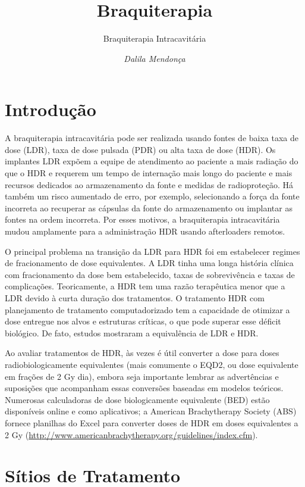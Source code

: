 \documentclass[11pt,a4paper]{article}
\title{\LobsterTwo\Huge{Braquiterapia}}
\author{\LobsterTwo\Large{Braquiterapia Intracavitária}\nocite{*}}
\date{\LobsterTwo\textit{Dalila Mendonça}}
\newcounter{exemplo}
\begin{document}
	\maketitle

\section{Introdução}

	A braquiterapia intracavitária pode ser realizada usando fontes de baixa taxa de dose (LDR), taxa de dose pulsada (PDR) ou alta taxa de dose (HDR). Os implantes LDR expõem a equipe de atendimento ao paciente a mais radiação do que o HDR e requerem um tempo de internação mais longo do paciente e mais recursos dedicados ao armazenamento da fonte e medidas de radioproteção. Há também um risco aumentado de erro, por exemplo, selecionando a força da fonte incorreta ao recuperar as cápsulas da fonte do armazenamento ou implantar as fontes na ordem incorreta. Por esses motivos, a braquiterapia intracavitária mudou amplamente para a administração HDR usando afterloaders remotos.

	O principal problema na transição da LDR para HDR foi em estabelecer regimes de fracionamento de dose equivalentes. A LDR tinha uma longa história clínica com fracionamento da dose bem estabelecido, taxas de sobrevivência e taxas de complicações. Teoricamente, a HDR tem uma razão terapêutica menor que a LDR devido à curta duração dos tratamentos. O tratamento HDR com planejamento de tratamento computadorizado tem a capacidade de otimizar a dose entregue nos alvos e estruturas críticas, o que pode superar esse déficit biológico. De fato, estudos mostraram a equivalência de LDR e HDR.

	Ao avaliar tratamentos de HDR, às vezes é útil converter a dose para doses radiobiologicamente equivalentes (mais comumente o EQD2, ou dose equivalente em frações de 2 Gy dia), embora seja importante lembrar as advertências e suposições que acompanham essas conversões baseadas em modelos teóricos.  Numerosas calculadoras de dose biologicamente equivalente (BED) estão disponíveis online e como aplicativos; a American Brachytherapy Society (ABS) fornece planilhas do Excel para converter doses de HDR em doses equivalentes a 2 Gy (\href{http://www.americanbrachytherapy.org/guidelines/index.cfm}{http://www.americanbrachytherapy.org/guidelines/index.cfm}).

\section{Sítios de Tratamento}
\end{document}
